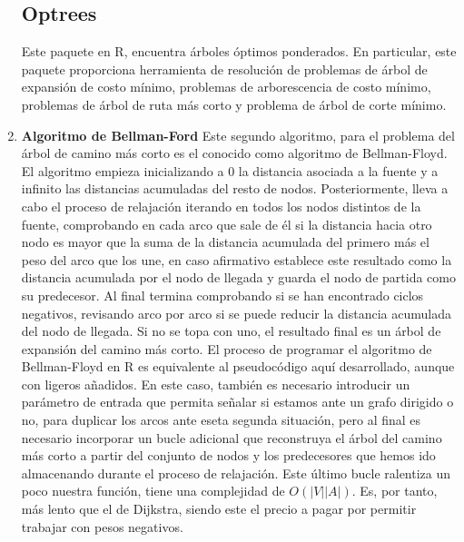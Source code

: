 \documentclass[a4,papper]{IEEEtran}
\begin{document}
\begin{enumerate}
    \subsection {\bf Optrees}
    Este paquete en R, encuentra árboles óptimos ponderados. En particular, este paquete proporciona herramienta de resolución de problemas de árbol de expansión de costo mínimo, problemas de arborescencia de costo mínimo, problemas de árbol de ruta más corto y problema de árbol de corte mínimo.
    \\
    \item {\bf {Algoritmo de Bellman-Ford}}
    Este segundo algoritmo, para el problema del árbol de camino más corto es el conocido como algoritmo de Bellman-Floyd. El algoritmo empieza inicializando a 0 la distancia asociada a la fuente y a infinito las distancias acumuladas del resto de nodos. Posteriormente, lleva a cabo el proceso de relajación iterando en todos los nodos distintos de la fuente, comprobando en cada arco que sale de él si la distancia hacia otro nodo es mayor que la suma de la distancia acumulada del primero más el peso del arco que los une, en caso afirmativo establece este resultado como la distancia acumulada por el nodo de llegada y guarda el nodo de partida como su predecesor. Al final termina comprobando si se han encontrado ciclos negativos, revisando arco por arco si se puede reducir la distancia acumulada del nodo de llegada. Si no se topa con uno, el resultado final es un árbol de expansión del camino más corto. El proceso de programar el algoritmo de Bellman-Floyd en R es equivalente al pseudocódigo aquí desarrollado, aunque con ligeros añadidos. En este caso, también es necesario introducir un parámetro de entrada que permita señalar si estamos ante un grafo dirigido o no, para duplicar los arcos ante eseta segunda situación, pero al final es necesario incorporar un bucle adicional que reconstruya el árbol del camino más corto a partir del conjunto de nodos y los predecesores que hemos ido almacenando durante el proceso de relajación. Este último bucle ralentiza un poco nuestra función, tiene una complejidad de $O(|V||A|)$. Es, por tanto, más lento que el de Dijkstra, siendo este el precio a pagar por permitir trabajar con pesos negativos.
    
\end{enumerate}
\end{document}
